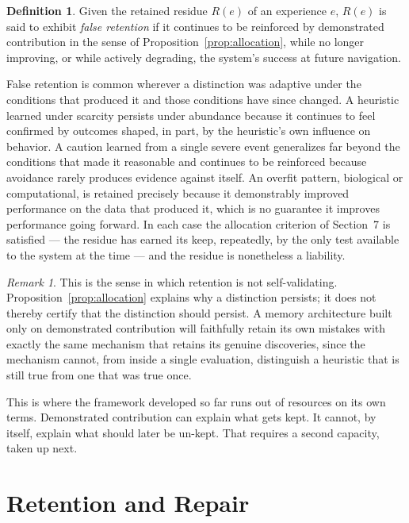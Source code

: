 \documentclass[11pt]{amsart}
\theoremstyle{plain}
\theoremstyle{definition}
\newtheorem{definition}[theorem]{Definition}
\theoremstyle{remark}
\newtheorem{remark}[theorem]{Remark}
\begin{document}
\begin{definition}
Given the retained residue $R(e)$ of an experience $e$, $R(e)$ is said
to exhibit \emph{false retention} if it continues to be reinforced by
demonstrated contribution in the sense of
Proposition~\ref{prop:allocation}, while no longer improving, or while
actively degrading, the system's success at future navigation.
\end{definition}

False retention is common wherever a distinction was adaptive under the
conditions that produced it and those conditions have since changed. A
heuristic learned under scarcity persists under abundance because it
continues to feel confirmed by outcomes shaped, in part, by the
heuristic's own influence on behavior. A caution learned from a single
severe event generalizes far beyond the conditions that made it
reasonable and continues to be reinforced because avoidance rarely
produces evidence against itself. An overfit pattern, biological or
computational, is retained precisely because it demonstrably improved
performance on the data that produced it, which is no guarantee it
improves performance going forward. In each case the allocation
criterion of Section~7 is satisfied --- the residue has earned its
keep, repeatedly, by the only test available to the system at the time
--- and the residue is nonetheless a liability.

\begin{remark}
This is the sense in which retention is not self-validating.
Proposition~\ref{prop:allocation} explains why a distinction persists;
it does not thereby certify that the distinction should persist. A
memory architecture built only on demonstrated contribution will
faithfully retain its own mistakes with exactly the same mechanism that
retains its genuine discoveries, since the mechanism cannot, from
inside a single evaluation, distinguish a heuristic that is still true
from one that was true once.
\end{remark}

This is where the framework developed so far runs out of resources on
its own terms. Demonstrated contribution can explain what gets kept. It
cannot, by itself, explain what should later be un-kept. That requires
a second capacity, taken up next.

\section{Retention and Repair}
\end{document}
